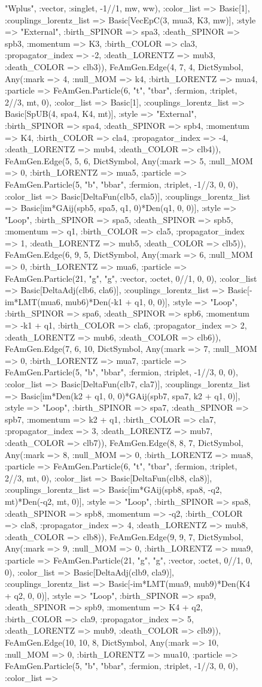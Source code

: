 \documentclass{revtex4}
\begin{document}
\begin{figure}[!htb]
\begin{center}
{"Wplus", :vector, :singlet, -1//1, mw, ww), :color_list => Basic[1], :couplings_lorentz_list => Basic[VecEpC(3, mua3, K3, mw)], :style => "External", :birth_SPINOR => spa3, :death_SPINOR => spb3, :momentum => K3, :birth_COLOR => cla3, :propagator_index => -2, :death_LORENTZ => mub3, :death_COLOR => clb3)), FeAmGen.Edge(4, 7, 4, Dict{Symbol, Any}(:mark => 4, :null_MOM => k4, :birth_LORENTZ => mua4, :particle => FeAmGen.Particle(6, "t", "tbar", :fermion, :triplet, 2//3, mt, 0), :color_list => Basic[1], :couplings_lorentz_list => Basic[SpUB(4, spa4, K4, mt)], :style => "External", :birth_SPINOR => spa4, :death_SPINOR => spb4, :momentum => K4, :birth_COLOR => cla4, :propagator_index => -4, :death_LORENTZ => mub4, :death_COLOR => clb4)), FeAmGen.Edge(5, 5, 6, Dict{Symbol, Any}(:mark => 5, :null_MOM => 0, :birth_LORENTZ => mua5, :particle => FeAmGen.Particle(5, "b", "bbar", :fermion, :triplet, -1//3, 0, 0), :color_list => Basic[DeltaFun(clb5, cla5)], :couplings_lorentz_list => Basic[im*GAij(spb5, spa5, q1, 0)*Den(q1, 0, 0)], :style => "Loop", :birth_SPINOR => spa5, :death_SPINOR => spb5, :momentum => q1, :birth_COLOR => cla5, :propagator_index => 1, :death_LORENTZ => mub5, :death_COLOR => clb5)), FeAmGen.Edge(6, 9, 5, Dict{Symbol, Any}(:mark => 6, :null_MOM => 0, :birth_LORENTZ => mua6, :particle => FeAmGen.Particle(21, "g", "g", :vector, :octet, 0//1, 0, 0), :color_list => Basic[DeltaAdj(clb6, cla6)], :couplings_lorentz_list => Basic[-im*LMT(mua6, mub6)*Den(-k1 + q1, 0, 0)], :style => "Loop", :birth_SPINOR => spa6, :death_SPINOR => spb6, :momentum => -k1 + q1, :birth_COLOR => cla6, :propagator_index => 2, :death_LORENTZ => mub6, :death_COLOR => clb6)), FeAmGen.Edge(7, 6, 10, Dict{Symbol, Any}(:mark => 7, :null_MOM => 0, :birth_LORENTZ => mua7, :particle => FeAmGen.Particle(5, "b", "bbar", :fermion, :triplet, -1//3, 0, 0), :color_list => Basic[DeltaFun(clb7, cla7)], :couplings_lorentz_list => Basic[im*Den(k2 + q1, 0, 0)*GAij(spb7, spa7, k2 + q1, 0)], :style => "Loop", :birth_SPINOR => spa7, :death_SPINOR => spb7, :momentum => k2 + q1, :birth_COLOR => cla7, :propagator_index => 3, :death_LORENTZ => mub7, :death_COLOR => clb7)), FeAmGen.Edge(8, 8, 7, Dict{Symbol, Any}(:mark => 8, :null_MOM => 0, :birth_LORENTZ => mua8, :particle => FeAmGen.Particle(6, "t", "tbar", :fermion, :triplet, 2//3, mt, 0), :color_list => Basic[DeltaFun(clb8, cla8)], :couplings_lorentz_list => Basic[im*GAij(spb8, spa8, -q2, mt)*Den(-q2, mt, 0)], :style => "Loop", :birth_SPINOR => spa8, :death_SPINOR => spb8, :momentum => -q2, :birth_COLOR => cla8, :propagator_index => 4, :death_LORENTZ => mub8, :death_COLOR => clb8)), FeAmGen.Edge(9, 9, 7, Dict{Symbol, Any}(:mark => 9, :null_MOM => 0, :birth_LORENTZ => mua9, :particle => FeAmGen.Particle(21, "g", "g", :vector, :octet, 0//1, 0, 0), :color_list => Basic[DeltaAdj(clb9, cla9)], :couplings_lorentz_list => Basic[-im*LMT(mua9, mub9)*Den(K4 + q2, 0, 0)], :style => "Loop", :birth_SPINOR => spa9, :death_SPINOR => spb9, :momentum => K4 + q2, :birth_COLOR => cla9, :propagator_index => 5, :death_LORENTZ => mub9, :death_COLOR => clb9)), FeAmGen.Edge(10, 10, 8, Dict{Symbol, Any}(:mark => 10, :null_MOM => 0, :birth_LORENTZ => mua10, :particle => FeAmGen.Particle(5, "b", "bbar", :fermion, :triplet, -1//3, 0, 0), :color_list => }
\end{center}
\end{figure}
\end{document}
